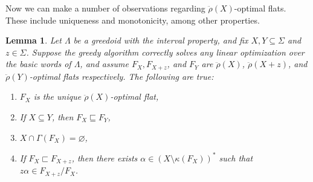 \documentclass[11pt]{article}
\newtheorem{lemma}[theorem]{Lemma}
\newcommand{\univ}{\Sigma}
\newcommand{\glang}{\Lambda}
\newcommand{\greedyrep}{\ddot{\rho}}
\begin{document}
Now we can make a number of observations regarding $\greedyrep(X)$-optimal flats.
These include uniqueness and monotonicity, among other properties.

\begin{lemma}\label{lem:big-stick}
    Let $\glang$ be a greedoid with the interval property, and fix $X,Y\subseteq \univ$ and $z\in\univ$.
    Suppose the greedy algorithm correctly solves any linear optimization over the basic words of $\glang$,
    and assume $F_X,F_{X+z}$, and $F_Y$ are $\greedyrep(X)$, $\greedyrep(X+z)$, and $\greedyrep(Y)$-optimal flats respectively.
    The following are true:
    \begin{enumerate}
        \item $F_X$ is the unique $\greedyrep(X)$-optimal flat,
        \item If $X\subseteq Y$, then $F_X \sqsubseteq F_Y$,
        \item $X\cap \Gamma(F_X) = \varnothing$,
        \item If $F_X \sqsubset F_{X+z}$, then there exists $\alpha \in (X\setminus\kappa(F_X))^*$ such that $z\alpha \in F_{X+z}/F_X$.
    \end{enumerate}
\end{lemma}
\end{document}
